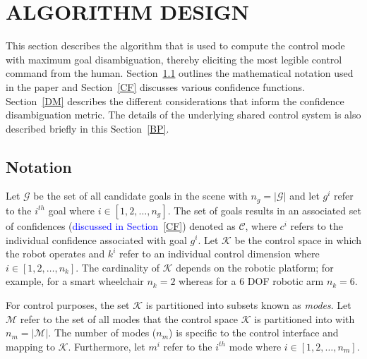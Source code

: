 \documentclass[conference]{IEEEtran}
\begin{document}
\section{ALGORITHM DESIGN} \label{ALGO}
This section describes the algorithm that is used to compute the control mode with maximum goal disambiguation, thereby eliciting the most legible control command from the human. Section~\ref{NOT} outlines the mathematical notation used in the paper and Section~\ref{CF} discusses various confidence functions. Section~\ref{DM} describes the different considerations that inform the confidence disambiguation metric. The details of the underlying shared control system is also described briefly in this Section~\ref{BP}.

\subsection{Notation}\label{NOT}


Let $\mathcal{G}$ be the set of all candidate goals in the scene with $n_g = \vert\mathcal{G}\vert$ and let $g^{i}$ refer to the $i^{th}$ goal where $i \in [1,2,\dots,n_g]$. The set of goals results in an associated set of confidences (\textcolor{blue}{discussed in Section~\ref{CF}}) denoted as $\mathcal{C}$, where $c^{i}$ refers to the individual confidence associated with goal $g^{i}$. Let $\mathcal{K}$ be the control space in which the robot operates and $k^{i}$ refer to an individual control dimension where $i \in [1,2,\dots,n_k]$.  The cardinality of $\mathcal{K}$ depends on the robotic platform; for example, for a smart wheelchair $n_k = 2$ whereas for a 6 DOF robotic arm $n_k = 6$.

For control purposes, the set $\mathcal{K}$ is partitioned into subsets known as \textit{modes}. Let $\mathcal{M}$ refer to the set of all modes that the control space $\mathcal{K}$ is partitioned into with $n_{m} = \vert\mathcal{M}\vert$. The number of modes ($n_{m}$) is specific to the control interface and mapping to $\mathcal{K}$. Furthermore, let $m^{i}$ refer to the $i^{th}$ mode where $i \in [1,2,\dots,n_{m}]$.
\end{document}
